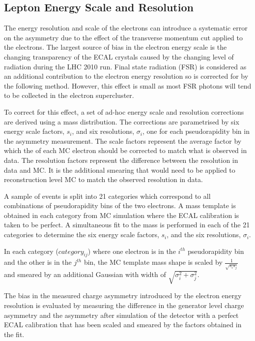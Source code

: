 \subsection{Lepton Energy Scale and Resolution}
\label{sec:adhoc}

The energy resolution and scale of the electrons can introduce a systematic
error on the asymmetry due to the effect of the transverse momentum cut applied
to the electrons. The largest source of bias in the electron energy scale is the
changing transparency of the ECAL crystals caused by the changing level of
radiation during the {LHC} 2010 run. Final state radiation (FSR) is considered
as an additional contribution to the electron energy resolution so is corrected for by the following
method. However, this effect is small as most FSR photons will tend to be
collected in the electron supercluster.

To correct for this effect, a set of ad-hoc energy scale and resolution corrections are
derived using a \Zee mass distribution. The corrections are parametrised by
six energy scale factors, $s_i$, and six resolutions, $\sigma_i$, one for each
pseudorapidity bin in the asymmetry measurement.
The scale factors represent the average factor by which the \pT of each {MC} electron
should be corrected to match what is observed in data.
The resolution factors represent the difference between the resolution in data and
{MC}. It is the additional smearing that would need to be applied to
reconstruction level {MC} to match the observed resolution in data.

A sample of \Zee events is  split into 21 categories which correspond to all
combinations of pseudorapidity bins of the two electrons.  A mass template is
obtained in each category from {MC} simulation where the {ECAL} calibration is
taken to be perfect.
A simultaneous fit to the \Zee mass is performed in each of the 21 categories
to determine the six energy scale factors, $s_i$, and the six resolutions, 
$\sigma_i$.

In each category ($category_{ij}$) where one electron is in the $i^{th}$
pseudorapidity bin and the other is in the $j^{th}$ bin, the {MC} template
mass shape is scaled by $\frac{1}{\sqrt{s_i s_j} } $
and smeared by an additional Gaussian with width of
$\sqrt{\sigma_i^2+\sigma_j^2}$.

The bias in the measured charge asymmetry introduced by the
electron energy resolution is evaluated by measuring the difference in the
generator level charge asymmetry and the asymmetry after simulation of the
detector with a perfect ECAL calibration that has been scaled and smeared by the
factors obtained in the fit.

